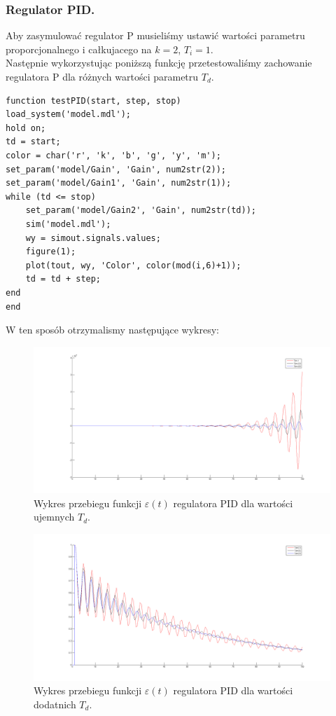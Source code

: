 \documentclass[a4paper,10pt]{article}
\begin{document}
\subsubsection{Regulator PID.}\label{sec:regPID}
Aby zasymulować regulator P musieliśmy ustawić wartości parametru proporcjonalnego i całkujacego na $k=2$, $T_{i}=1$. \\
Następnie wykorzystując poniższą funkcję przetestowaliśmy zachowanie regulatora P dla różnych wartości parametru $T_{d}$. \\
\begin{lstlisting}[caption=Funkcja testująca regulator P.]
function testPID(start, step, stop)
load_system('model.mdl');
hold on;
td = start;
color = char('r', 'k', 'b', 'g', 'y', 'm');
set_param('model/Gain', 'Gain', num2str(2));
set_param('model/Gain1', 'Gain', num2str(1));
while (td <= stop)
    set_param('model/Gain2', 'Gain', num2str(td));
    sim('model.mdl');
    wy = simout.signals.values;
    figure(1);
    plot(tout, wy, 'Color', color(mod(i,6)+1));
    td = td + step;
end
end
\end{lstlisting}
W ten sposób otrzymalismy następujące wykresy: \\
\begin{figure}[!h]
    \centering
	\includegraphics[width=130mm]{CW2-regulatorPID-eu.png}
	\caption{Wykres przebiegu funkcji $\varepsilon(t)$ regulatora PID dla wartości ujemnych $T_{d}$.}
    \label{fig:regulatorPIDeu}
\end{figure}
\begin{figure}[!h]
    \centering
	\includegraphics[width=130mm]{CW2-regulatorPID-ed.png}
	\caption{Wykres przebiegu funkcji $\varepsilon(t)$ regulatora PID dla wartości dodatnich $T_{d}$.}
    \label{fig:regulatorPIDed}
\end{figure}
\end{document}
